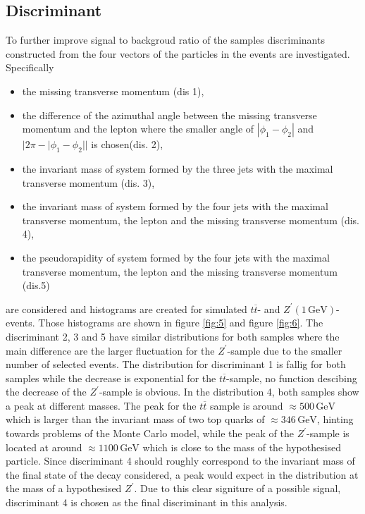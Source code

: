 \subsection{Discriminant}
To further improve signal to backgroud ratio of the samples discriminants constructed from the four vectors of the particles in the events are investigated. 
Specifically 
\begin{itemize}
  \item the missing transverse momentum (dis 1),
  \item the difference of the azimuthal angle between the missing transverse momentum and the lepton where the smaller angle of $|\phi_1 - \phi_2|$ and 
  $|2 \pi - |\phi_1 -\phi_2||$ is chosen(dis. 2), 
  \item the invariant mass of system formed by the three jets with the maximal transverse momentum (dis. 3),
  \item the invariant mass of system formed by the four jets with the maximal transverse momentum, the lepton and the missing transverse momentum (dis. 4), 
  \item the pseudorapidity of system formed by the four jets with the maximal transverse momentum, the lepton and the missing transverse momentum (dis.5) 
\end{itemize}
are considered and histograms are created for simulated $t \overline{t}$- and $Z^\prime(1 \, \si{\giga\eV})$-events. Those histograms are shown in figure 
\ref{fig:5} and figure \ref{fig:6}. The discriminant 2, 3 and 5 have similar distributions for both samples where the main difference are the larger fluctuation 
for the $Z^\prime$-sample due to the smaller number of selected events. The distribution for discriminant 1 is fallig for both samples while the decrease is exponential 
for the $t \overline{t}$-sample, no function descibing the decrease of the $Z^\prime$-sample is obvious. In the distribution 4, both samples show a peak 
at different masses. The peak for the $t \overline{t}$ sample is around $\approx 500 \, \si{\giga\eV}$ which is larger than the invariant mass of 
two top quarks of $\approx 346 \, \si{\giga\eV}$, hinting towards problems of the Monte Carlo model, while the peak of the $Z^\prime$-sample is located at around $\approx 1100 \, \si{\giga\eV}$ which is close to the mass of the 
hypothesised particle. Since discriminant 4 should roughly correspond to the invariant mass of the final state of the decay considered, a peak would expect 
 in the distribution at the mass of a hypothesised $Z^\prime$. Due to this clear signiture of a possible signal, discriminant 4 is chosen as 
the final discriminant in this analysis.



